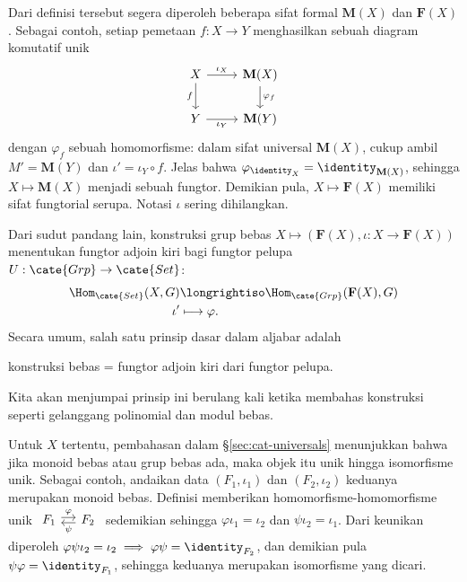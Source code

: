 Dari definisi tersebut segera diperoleh beberapa sifat formal $\mathbf{M}(X)$ dan $\mathbf{F}(X)$. Sebagai contoh, setiap pemetaan $f: X \to Y$ menghasilkan sebuah diagram komutatif unik
\[ \begin{tikzcd}
	X \arrow[d, "f"'] \arrow[r, "{\iota_X}"] & \mathbf{M}(X) \arrow[d, "{\varphi_f}"] \\
	Y \arrow[r, "{\iota_Y}"'] & \mathbf{M}(Y)
\end{tikzcd} \]
dengan $\varphi_f$ sebuah homomorfisme: dalam sifat universal $\mathbf{M}(X)$, cukup ambil $M' = \mathbf{M}(Y)$ dan $\iota' = \iota_Y \circ f$. Jelas bahwa $\varphi_{\identity_X} = \identity_{\mathbf{M}(X)}$, sehingga $X \mapsto \mathbf{M}(X)$ menjadi sebuah fungtor. Demikian pula, $X \mapsto \mathbf{F}(X)$ memiliki sifat fungtorial serupa. Notasi $\iota$ sering dihilangkan.

\begin{remark}
	Dari sudut pandang lain, konstruksi grup bebas $X \mapsto (\mathbf{F}(X), \iota: X \to \mathbf{F}(X))$ menentukan fungtor adjoin kiri bagi fungtor pelupa $U: \cate{Grp} \to \cate{Set}$:
	\begin{align*}
		\Hom_\cate{Set}(X, G) & \longrightiso \Hom_\cate{Grp}(\mathbf{F}(X), G) \\
		\iota' & \longmapsto \varphi.
	\end{align*}
	Secara umum, salah satu prinsip dasar dalam aljabar adalah
	\begin{center}
		konstruksi bebas = fungtor adjoin kiri dari fungtor pelupa.
	\end{center}
	Kita akan menjumpai prinsip ini berulang kali ketika membahas konstruksi seperti gelanggang polinomial dan modul bebas.
\end{remark}
Untuk $X$ tertentu, pembahasan dalam \S\ref{sec:cat-universals} menunjukkan bahwa jika monoid bebas atau grup bebas ada, maka objek itu unik hingga isomorfisme unik. Sebagai contoh, andaikan data $(F_1, \iota_1)$ dan $(F_2, \iota_2)$ keduanya merupakan monoid bebas. Definisi memberikan homomorfisme-homomorfisme unik $\begin{tikzcd}[column sep=small] F_1 \arrow[r, yshift=0.5ex, "\varphi"] & F_2 \arrow[l, yshift=-0.5ex, "\psi"] \end{tikzcd}$ sedemikian sehingga $\varphi \iota_1 =\iota_2$ dan $\psi \iota_2 = \iota_1$. Dari keunikan diperoleh $ \varphi\psi \iota_2 = \iota_2 \implies \varphi\psi = \identity_{F_2}$, dan demikian pula $\psi\varphi = \identity_{F_1}$, sehingga keduanya merupakan isomorfisme yang dicari.

